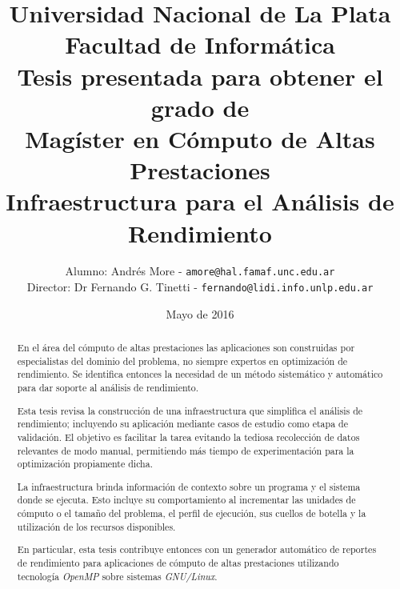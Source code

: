 \documentclass[a4paper]{report}
\begin{document}
\setlength{\parindent}{0cm}
\renewcommand{\tablename}{Tabla}

\title{Universidad Nacional de La Plata\\Facultad de Informática\\ \bigskip
{\large Tesis presentada para obtener el grado de \\}  Magíster en Cómputo de Altas Prestaciones\\ \bigskip
  Infraestructura para el Análisis de Rendimiento}

\author{
  Alumno: Andrés More - {\tt amore@hal.famaf.unc.edu.ar}\\
  Director: Dr Fernando G. Tinetti - {\tt fernando@lidi.info.unlp.edu.ar}
}

\date{Mayo de 2016}

\maketitle

\begin{abstract}

En el área del cómputo de altas prestaciones las aplicaciones son construidas por especialistas del dominio del problema, no siempre expertos en optimización de rendimiento. Se identifica entonces la necesidad de un método sistemático y automático para dar soporte al análisis de rendimiento.

\bigskip

Esta tesis revisa la construcción de una infraestructura que simplifica el análisis de rendimiento; incluyendo su aplicación mediante casos de estudio como etapa de validación. El objetivo es facilitar la tarea evitando la tediosa recolección de datos relevantes de modo manual, permitiendo más tiempo de experimentación para la optimización propiamente dicha.

\bigskip

La infraestructura brinda información de contexto sobre un programa y el sistema donde se ejecuta. Esto incluye su comportamiento al incrementar las unidades de cómputo o el tamaño del problema,
el perfil de ejecución, sus cuellos de botella y la utilización de los recursos disponibles.

\bigskip

En particular, esta tesis contribuye entonces con un generador automático de reportes de rendimiento para aplicaciones de cómputo de altas prestaciones utilizando tecnología {\it OpenMP} sobre sistemas {\it GNU/Linux}.

\end{abstract}
\end{document}
